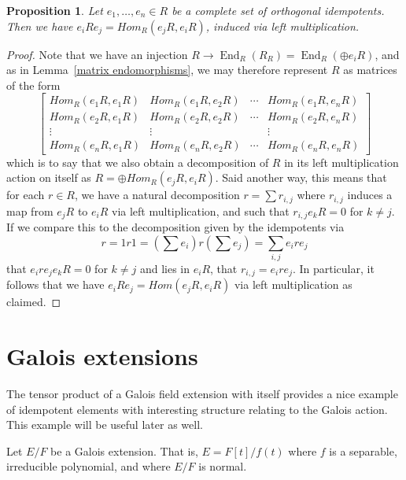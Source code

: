 \documentclass[12pt]{report}
\theoremstyle{plain}
\newtheorem{prop}[thm]{Proposition}
\newcommand{\oper}[1]{\operatorname{#1}}
\newcommand{\End}{\oper{End}}
\begin{document}
\begin{prop} \label{pierce prop}
Let $e_1, \ldots, e_n \in R$ be a complete set of orthogonal idempotents.
Then we have $e_iRe_j = Hom_R(e_jR, e_iR)$, induced via left
multiplication.
\end{prop}
\begin{proof}
Note that we have an injection $R \to \End_R(R_R) = \End_R(\oplus e_iR)$,
and as in Lemma~\ref{matrix endomorphisms}, we may therefore represent $R$ as matrices of the
form
\[
\left[
\begin{matrix}
Hom_R(e_1R, e_1R) & Hom_R(e_1R, e_2R) & \cdots & Hom_R(e_1R, e_nR) \\
Hom_R(e_2R, e_1R) & Hom_R(e_2R, e_2R) & \cdots & Hom_R(e_2R, e_nR) \\
\vdots & \vdots & & \vdots \\
Hom_R(e_nR, e_1R) & Hom_R(e_nR, e_2R) & \cdots & Hom_R(e_nR, e_nR)
\end{matrix}
\right]
\]
which is to say that we also obtain a decomposition of $R$ in its left
multiplication action on itself as $R = \oplus Hom_R(e_jR, e_iR)$. Said
another way, this means that for each $r \in R$, we have a natural
decomposition $r = \sum r_{i,j}$ where $r_{i,j}$ induces a map from $e_jR$
to $e_iR$ via left multiplication, and such that $r_{i,j} e_k R = 0$ for $k
\neq j$. If we compare this to the decomposition given by the idempotents
via
\[r = 1r1 = \left(\sum e_i\right) r \left(\sum e_j\right) = \sum_{i,j} e_i
r e_j \]
that $e_i r e_j e_k R = 0$ for $k \neq j$ and lies in $e_iR$, that $r_{i,j}
= e_i r e_j$. In particular, it follows that we have $e_i R e_j = Hom(e_jR,
e_i R)$ via left multiplication as claimed.
\end{proof}

\section{Galois extensions}

The tensor product of a Galois field extension with itself provides a nice
example of idempotent elements with interesting structure relating to the
Galois action. This example will be useful later as well.

Let $E/F$ be a Galois extension. That is, $E = F[t]/f(t)$ where $f$ is a
separable, irreducible polynomial, and where $E/F$ is normal. 
\end{document}
